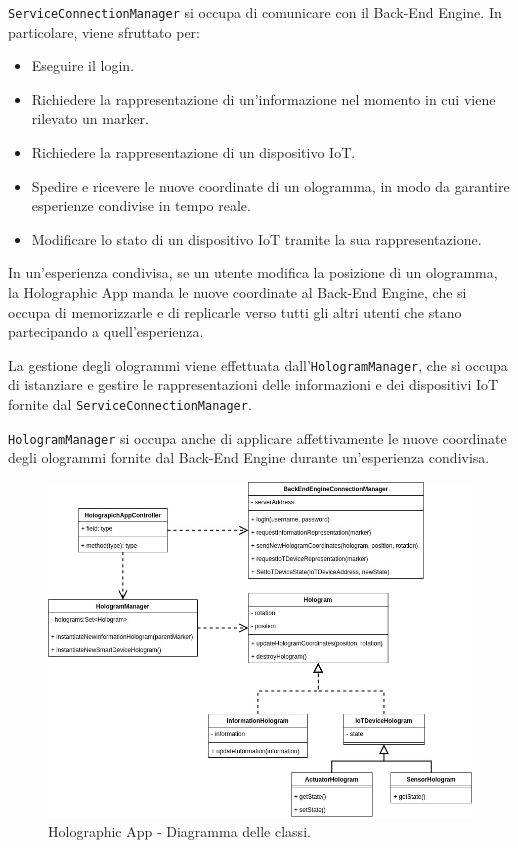 \texttt{ServiceConnectionManager} si occupa di comunicare con il Back-End Engine. In particolare, viene sfruttato per:
\begin{itemize}
    \item Eseguire il login.
    \item Richiedere la rappresentazione di un'informazione nel momento in cui viene rilevato un marker.
    \item Richiedere la rappresentazione di un dispositivo IoT.
    \item Spedire e ricevere le nuove coordinate di un ologramma, in modo da garantire esperienze condivise in tempo reale.
    \item Modificare lo stato di un dispositivo IoT tramite la sua rappresentazione.
\end{itemize}

In un'esperienza condivisa, se un utente modifica la posizione di un ologramma, la Holographic App manda le nuove coordinate al Back-End Engine, che si occupa di memorizzarle e di replicarle verso tutti gli altri utenti che stano partecipando a quell'esperienza.

La gestione degli ologrammi viene effettuata dall'\texttt{HologramManager}, che si occupa di istanziare e gestire le rappresentazioni delle informazioni e dei dispositivi IoT fornite dal \texttt{ServiceConnectionManager}.

\texttt{HologramManager} si occupa anche di applicare affettivamente le nuove coordinate degli ologrammi fornite dal Back-End Engine durante un'esperienza condivisa.

\begin{figure}[H]
    \centering
    \includegraphics[width=\textwidth]{images/MR Client - Diagramma Classi.jpg}
    \caption{Holographic App - Diagramma delle classi.}
    \label{fig:figure45}
\end{figure}

